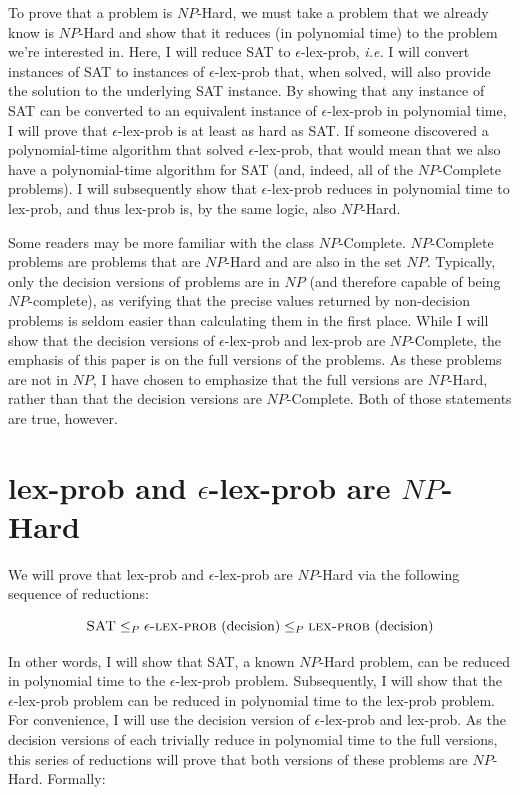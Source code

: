 \documentclass[sigconf]{acmart}
\begin{document}
To prove that a problem is $NP$-Hard, we must take a problem that we already know is $NP$-Hard and show that it reduces (in polynomial time) to the problem we're interested in.  Here, I will reduce {\sc SAT} to {\sc $\epsilon$-lex-prob}, \textit{i.e.} I will convert instances of {\sc SAT} to instances of {\sc $\epsilon$-lex-prob} that, when solved, will also provide the solution to the underlying {\sc SAT} instance. By showing that any instance of {\sc SAT} can be converted to an equivalent instance of {\sc $\epsilon$-lex-prob} in polynomial time, I will prove that {\sc $\epsilon$-lex-prob} is at least as hard as {\sc SAT}. If someone discovered a polynomial-time algorithm that solved {\sc $\epsilon$-lex-prob}, that would mean that we also have a polynomial-time algorithm for {\sc SAT} (and, indeed, all of the $NP$-Complete problems). I will subsequently show that {\sc $\epsilon$-lex-prob} reduces in polynomial time to {\sc lex-prob}, and thus {\sc lex-prob} is, by the same logic, also $NP$-Hard.

Some readers may be more familiar with the class $NP$-Complete. $NP$-Complete problems are problems that are $NP$-Hard and are also in the set $NP$. Typically, only the decision versions of problems are in $NP$ (and therefore capable of being $NP$-complete), as verifying that the precise values returned by non-decision problems is seldom easier than calculating them in the first place. While I will show that the decision versions of {\sc $\epsilon$-lex-prob} and {\sc lex-prob} are $NP$-Complete, the emphasis of this paper is on the full versions of the problems. As these problems are not in $NP$, I have chosen to emphasize that the full versions are $NP$-Hard, rather than that the decision versions are $NP$-Complete. Both of those statements are true, however.

\section{{\sc lex-prob} and {\sc $\epsilon$-lex-prob} are $NP$-Hard}

We will prove that {\sc lex-prob} and {\sc $\epsilon$-lex-prob} are $NP$-Hard via the following sequence of reductions:

\[
\text{{\sc SAT}} \leq_{P} \text{{\sc $\epsilon$-lex-prob} (decision)} \leq_{P} \text{{\sc lex-prob} (decision)}
\]

In other words, I will show that {\sc SAT}, a known $NP$-Hard problem, can be reduced in polynomial time to the {\sc $\epsilon$-lex-prob} problem. Subsequently, I will show that the {\sc $\epsilon$-lex-prob} problem can be reduced in polynomial time to the {\sc lex-prob} problem. For convenience, I will use the decision version of {\sc $\epsilon$-lex-prob} and {\sc lex-prob}. As the decision versions of each trivially reduce in polynomial time to the full versions, this series of reductions will prove that both versions of these problems are $NP$-Hard. Formally:
\end{document}
